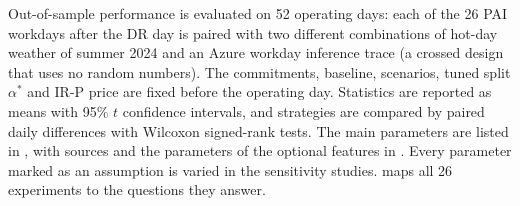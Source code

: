 Out-of-sample performance is evaluated on 52 operating days: each of the 26 PAI workdays after the DR day is paired with
two different combinations of hot-day weather of summer 2024 and an Azure workday inference trace (a crossed design that
uses no random numbers). The commitments, baseline, scenarios, tuned split $\alpha^*$ and IR-P price are fixed before
the operating day. Statistics are reported as means with 95\% $t$ confidence intervals, and strategies are compared by
paired daily differences with Wilcoxon signed-rank tests. The main parameters are listed in , with
sources and the parameters of the optional features in . Every parameter marked as an assumption is
varied in the sensitivity studies.  maps all 26 experiments to the questions they answer.

